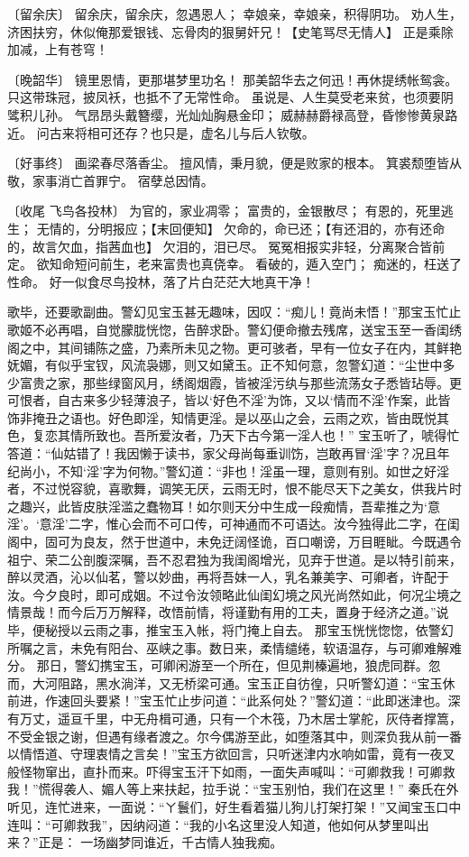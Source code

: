 \documentclass[12pt,oneside]{book}
\begin{document}
〔留余庆〕
留余庆，留余庆，忽遇恩人；
幸娘亲，幸娘亲，积得阴功。
劝人生，济困扶穷，休似俺那爱银钱、忘骨肉的狠舅奸兄！【史笔骂尽无情人】
正是乘除加减，上有苍穹！

〔晚韶华〕
镜里恩情，更那堪梦里功名！
那美韶华去之何迅！再休提绣帐鸳衾。
只这带珠冠，披凤袄，也抵不了无常性命。
虽说是、人生莫受老来贫，也须要阴骘积儿孙。
气昂昂头戴簪缨，光灿灿胸悬金印；
威赫赫爵禄高登，昏惨惨黄泉路近。
问古来将相可还存？也只是，虚名儿与后人钦敬。

〔好事终〕
画梁春尽落香尘。
擅风情，秉月貌，便是败家的根本。
箕裘颓堕皆从敬，家事消亡首罪宁。
宿孽总因情。

〔收尾 飞鸟各投林〕
为官的，家业凋零；
富贵的，金银散尽；
有恩的，死里逃生；
无情的，分明报应；【末回便知】
欠命的，命已还；【有还泪的，亦有还命的，故言欠血，指茜血也】
欠泪的，泪已尽。
冤冤相报实非轻，分离聚合皆前定。
欲知命短问前生，老来富贵也真侥幸。
看破的，遁入空门；
痴迷的，枉送了性命。
好一似食尽鸟投林，落了片白茫茫大地真干净！

歌毕，还要歌副曲。警幻见宝玉甚无趣味，因叹：“痴儿！竟尚未悟！”那宝玉忙止歌姬不必再唱，自觉朦胧恍惚，告醉求卧。警幻便命撤去残席，送宝玉至一香闺绣阁之中，其间铺陈之盛，乃素所未见之物。更可骇者，早有一位女子在内，其鲜艳妩媚，有似乎宝钗，风流袅娜，则又如黛玉。正不知何意，忽警幻道：“尘世中多少富贵之家，那些绿窗风月，绣阁烟霞，皆被淫污纨与那些流荡女子悉皆玷辱。更可恨者，自古来多少轻薄浪子，皆以‘好色不淫’为饰，又以‘情而不淫’作案，此皆饰非掩丑之语也。好色即淫，知情更淫。是以巫山之会，云雨之欢，皆由既悦其色，复恋其情所致也。吾所爱汝者，乃天下古今第一淫人也！”
宝玉听了，唬得忙答道：“仙姑错了！我因懒于读书，家父母尚每垂训饬，岂敢再冒‘淫’字？况且年纪尚小，不知‘淫’字为何物。”警幻道：“非也！淫虽一理，意则有别。如世之好淫者，不过悦容貌，喜歌舞，调笑无厌，云雨无时，恨不能尽天下之美女，供我片时之趣兴，此皆皮肤淫滥之蠢物耳！如尔则天分中生成一段痴情，吾辈推之为‘意淫’。‘意淫’二字，惟心会而不可口传，可神通而不可语达。汝今独得此二字，在闺阁中，固可为良友，然于世道中，未免迂阔怪诡，百口嘲谤，万目睚眦。今既遇令祖宁、荣二公剖腹深嘱，吾不忍君独为我闺阁增光，见弃于世道。是以特引前来，醉以灵酒，沁以仙茗，警以妙曲，再将吾妹一人，乳名兼美字、可卿者，许配于汝。今夕良时，即可成姻。不过令汝领略此仙闺幻境之风光尚然如此，何况尘境之情景哉！而今后万万解释，改悟前情，将谨勤有用的工夫，置身于经济之道。”说毕，便秘授以云雨之事，推宝玉入帐，将门掩上自去。
那宝玉恍恍惚惚，依警幻所嘱之言，未免有阳台、巫峡之事。数日来，柔情缱绻，软语温存，与可卿难解难分。
那日，警幻携宝玉，可卿闲游至一个所在，但见荆榛遍地，狼虎同群。忽而，大河阻路，黑水淌洋，又无桥梁可通。宝玉正自彷徨，只听警幻道：“宝玉休前进，作速回头要紧！”宝玉忙止步问道：“此系何处？”警幻道：“此即迷津也。深有万丈，遥亘千里，中无舟楫可通，只有一个木筏，乃木居士掌舵，灰侍者撑篙，不受金银之谢，但遇有缘者渡之。尔今偶游至此，如堕落其中，则深负我从前一番以情悟道、守理衷情之言矣！”宝玉方欲回言，只听迷津内水响如雷，竟有一夜叉般怪物窜出，直扑而来。吓得宝玉汗下如雨，一面失声喊叫：“可卿救我！可卿救我！”慌得袭人、媚人等上来扶起，拉手说：“宝玉别怕，我们在这里！”
秦氏在外听见，连忙进来，一面说：“ㄚ鬟们，好生看着猫儿狗儿打架打架！”又闻宝玉口中连叫：“可卿救我”，因纳闷道：“我的小名这里没人知道，他如何从梦里叫出来？”正是：
一场幽梦同谁近，千古情人独我痴。
\end{document}
